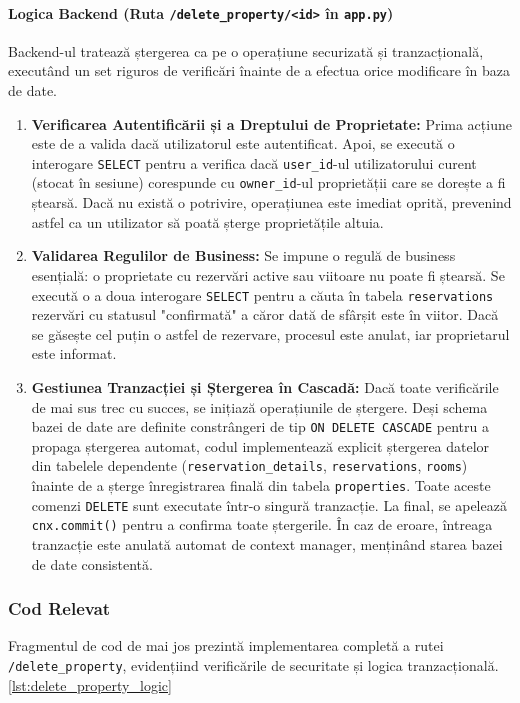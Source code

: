 \documentclass[12pt, a4paper, oneside, romanian]{teza-upb}
\begin{document}
\paragraph{Logica Backend (Ruta \texttt{/delete\_property/<id>} în \texttt{app.py})}
Backend-ul tratează ștergerea ca pe o operațiune securizată și tranzacțională, executând un set riguros de verificări înainte de a efectua orice modificare în baza de date.
\begin{enumerate}
	\item \textbf{Verificarea Autentificării și a Dreptului de Proprietate:} Prima acțiune este de a valida dacă utilizatorul este autentificat. Apoi, se execută o interogare \texttt{SELECT} pentru a verifica dacă \texttt{user\_id}-ul utilizatorului curent (stocat în sesiune) corespunde cu \texttt{owner\_id}-ul proprietății care se dorește a fi ștearsă. Dacă nu există o potrivire, operațiunea este imediat oprită, prevenind astfel ca un utilizator să poată șterge proprietățile altuia.
	
	\item \textbf{Validarea Regulilor de Business:} Se impune o regulă de business esențială: o proprietate cu rezervări active sau viitoare nu poate fi ștearsă. Se execută o a doua interogare \texttt{SELECT} pentru a căuta în tabela \texttt{reservations} rezervări cu statusul "confirmată" a căror dată de sfârșit este în viitor. Dacă se găsește cel puțin o astfel de rezervare, procesul este anulat, iar proprietarul este informat.
	
	\item \textbf{Gestiunea Tranzacției și Ștergerea în Cascadă:} Dacă toate verificările de mai sus trec cu succes, se inițiază operațiunile de ștergere. Deși schema bazei de date are definite constrângeri de tip \texttt{ON DELETE CASCADE} pentru a propaga ștergerea automat, codul implementează explicit ștergerea datelor din tabelele dependente (\texttt{reservation\_details}, \texttt{reservations}, \texttt{rooms}) înainte de a șterge înregistrarea finală din tabela \texttt{properties}. Toate aceste comenzi \texttt{DELETE} sunt executate într-o singură tranzacție. La final, se apelează \texttt{cnx.commit()} pentru a confirma toate ștergerile. În caz de eroare, întreaga tranzacție este anulată automat de context manager, menținând starea bazei de date consistentă.
\end{enumerate}

\subsubsection{Cod Relevat}
Fragmentul de cod de mai jos prezintă implementarea completă a rutei \texttt{/delete\_property}, evidențiind verificările de securitate și logica tranzacțională. \ref{lst:delete_property_logic}
 
\end{document}
